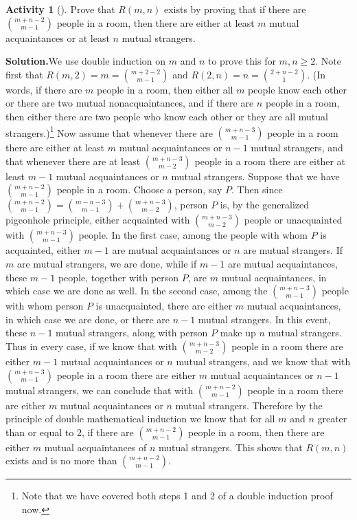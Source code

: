 \documentclass[10pt,]{book}
\theoremstyle{plain}
\theoremstyle{definition}
\newtheorem{activity}[project]{Activity}
\numberwithin{equation}{chapter}
\begin{document}
\begin{activity}[]\label{Ramseybound}
Prove that \(R(m,n)\) exists by proving that if there are \(m+n-2\choose m-1\) people in a room, then there are either at least \(m\) mutual acquaintances or at least \(n\) mutual strangers.%
\par\medskip\noindent%
\textbf{Solution.}\quad We use double induction on \(m\) and \(n\) to prove this for \(m,n\ge 2\). Note first that \(R(m,2)=m={m+2-2\choose m-1}\) and \(R(2,n)
=n={2+n-2\choose 1}\). (In words, if there are \(m\) people in a room, then either all \(m\) people know each other or there are two mutual nonacquaintances, and if there are \(n\) people in a room, then either there are two people who know each other or they are all mutual strangers.)\footnote{Note that we have covered both steps 1 and 2 of a double induction proof now.\label{fn-3}} Now assume that whenever there are \(m+n-3\choose m-1\) people in a room there are either at least \(m\) mutual acquaintances or \(n-1\) mutual strangers, and that whenever there are at least \(m+n-3\choose m-2\) people in a room there are either at least \(m-1\) mutual acquaintances or \(n\) mutual strangers. Suppose that we have \(m+n-2\choose m-1\) people in a room. Choose a person, say \(P\). Then since \({m+n-2\choose m-1} = {m-n-3\choose m-1} +{m+n-3\choose m-2}\), person \(P\) is, by the generalized pigeonhole principle, either acquainted with \(m+n-3\choose m-2\) people or unacquainted with \(m+n-3\choose m-1\) people. In the first case, among the people with whom \(P\) is acquainted, either \(m-1\) are mutual acquaintances or \(n\) are mutual strangers. If \(m\) are mutual strangers, we are done, while if \(m-1\) are mutual acquaintances, these \(m-1\) people, together with person \(P\), are \(m\) mutual acquaintances, in which case we are done as well. In the second case, among the \(m+n-3\choose m-1\) people with whom person \(P\) is unacquainted, there are either \(m\) mutual acquaintances, in which case we are done, or there are \(n-1\) mutual strangers. In this event, these \(n-1\) mutual strangers, along with person \(P\) make up \(n\) mutual strangers. Thus in every case, if we know that with \(m+n-3\choose m-2\) people in a room there are either \(m-1\) mutual acquaintances or \(n\) mutual strangers, and we know that with \(m+n-3\choose m-1\) people in a room there are either \(m\) mutual acquaintances or \(n-1\) mutual strangers, we can conclude that with \(m+n-2\choose m-1\) people in a room there are either \(m\) mutual acquaintances or \(n\) mutual strangers. Therefore by the principle of double mathematical induction we know that for all \(m\) and \(n\) greater than or equal to 2, if there are \(m+n-2\choose m-1\) people in a room, then there are either \(m\) mutual acquaintances of \(n\) mutual strangers. This shows that \(R(m,n)\) exists and is no more than \(m+n-2\choose m-1\).%
\end{activity}
\end{document}
